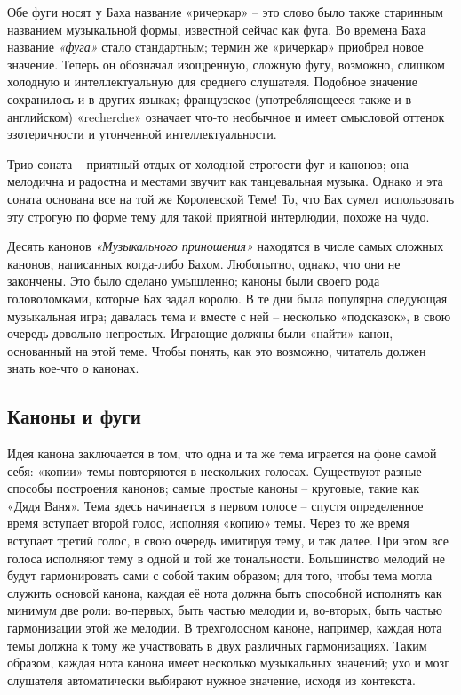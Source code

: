 \documentclass[../main.tex]{subfiles}
\begin{document}
Обе фуги носят у Баха название «ричеркар» \--- это слово было также старинным названием музыкальной формы, известной сейчас как фуга. Во времена Баха название \emph{«фуга»} стало стандартным; термин же «ричеркар» приобрел новое значение. Теперь он обозначал изощренную, сложную фугу, возможно, слишком холодную и интеллектуальную для среднего слушателя. Подобное значение сохранилось и в других языках; французское (употребляющееся так­же и в английском) «recherche» означает что-то необычное и имеет смысловой оттенок эзотеричности и утонченной интеллектуальности.

Трио-соната \--- приятный отдых от холодной строгости фуг и канонов; она мелодична и радостна и местами звучит как танцевальная музыка. Однако и эта соната основана все на той же Королевской Теме! То, что Бах сумел~использовать эту строгую по форме тему для такой приятной интерлюдии, похоже на чудо.

Десять канонов \emph{«Музыкального приношения»} находятся в числе самых сложных канонов, написанных когда-либо Бахом. Любопытно, однако, что они не закончены. Это было сделано умышленно; каноны были своего рода головоломками, которые Бах задал королю. В те дни была популярна следующая музыкальная игра; давалась тема и вместе с ней \--- несколько «подсказок», в свою очередь довольно непростых. Играющие должны были «найти» канон, основанный на этой теме. Чтобы понять, как это возможно, читатель должен знать кое-что о канонах.


\subsection{Каноны и фуги}

Идея канона заключается в том, что одна и та же тема играется на фоне самой себя: «копии» темы повторяются в нескольких голосах. Существуют разные способы построения канонов; самые простые каноны \--- круговые, такие как «Дядя Ваня». Тема здесь начинается в первом голосе \--- спустя определенное время вступает второй голос, исполняя «копию» темы. Через то же время вступает третий голос, в свою очередь имитируя тему, и так далее. При этом все голоса исполняют тему в одной и той же тональности. Большинство мелодий не будут гармонировать сами с собой таким образом; для того, чтобы тема могла служить основой канона, каждая её нота должна быть способной исполнять как минимум две роли: во-первых, быть частью мелодии и, во-вторых, быть частью гармонизации этой же мелодии. В трехголосном каноне, например, каждая нота темы должна к тому же участвовать в двух различных гармонизациях. Таким образом, каждая нота канона имеет несколько музыкальных значений; ухо и мозг слушателя автоматически выбирают нужное значение, исходя из контекста.
\end{document}
